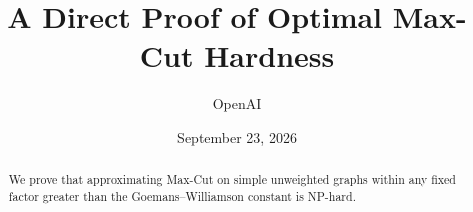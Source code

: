 \documentclass[11pt]{article}
\title{A Direct Proof of Optimal Max-Cut Hardness}
\author{OpenAI}
\date{September 23, 2026}
\numberwithin{equation}{section}
\theoremstyle{definition}
\theoremstyle{remark}
\begin{document}
\maketitle
\begin{abstract}
We prove that approximating Max-Cut on simple unweighted graphs within
any fixed factor greater than the Goemans--Williamson constant is NP-hard.
\end{abstract}











\appendix





\end{document}
